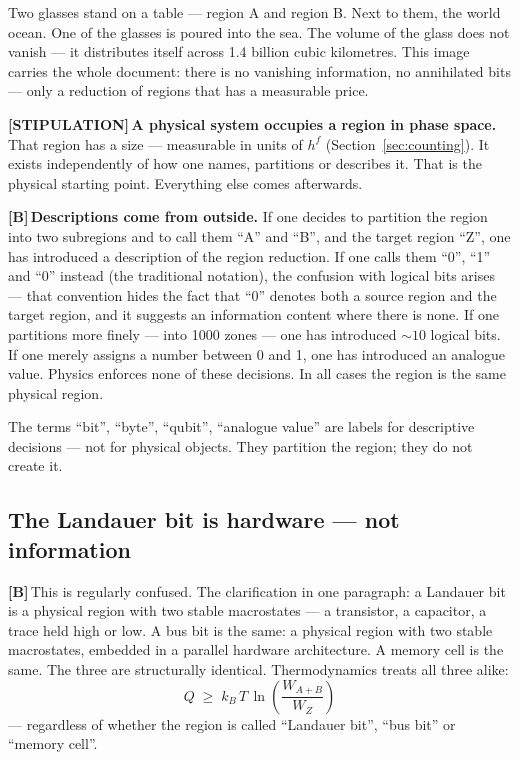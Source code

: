 \documentclass[11pt,a4paper]{article}
\newcommand{\LS}{\textcolor{laySet}{\textbf{\footnotesize\textsf{[STIPULATION]}}}\,}
\newcommand{\LB}{\textcolor{layB}{\textbf{\footnotesize\textsf{[B]}}}\,}
\begin{document}
Two glasses stand on a table --- region A and region B. Next to them, the world
ocean. One of the glasses is poured into the sea. The volume of the glass does not
vanish --- it distributes itself across 1.4 billion cubic kilometres. This image
carries the whole document: there is no vanishing information, no annihilated
bits --- only a reduction of regions that has a measurable price.

\LS \textbf{A physical system occupies a region in phase space.} That region has a
size --- measurable in units of $h^f$ (Section~\ref{sec:counting}). It exists
independently of how one names, partitions or describes it. That is the physical
starting point. Everything else comes afterwards.

\LB \textbf{Descriptions come from outside.} If one decides to partition the
region into two subregions and to call them “A” and “B”, and the target region
“Z”, one has introduced a description of the region reduction. If one calls them
“0”, “1” and “0” instead (the traditional notation), the confusion with logical
bits arises --- that convention hides the fact that “0” denotes both a source
region and the target region, and it suggests an information content where there
is none. If one partitions more finely --- into 1000 zones --- one has introduced
${\sim}10$ logical bits. If one merely assigns a number between 0 and 1, one has
introduced an analogue value. Physics enforces none of these decisions. In all
cases the region is the same physical region.

The terms “bit”, “byte”, “qubit”, “analogue value” are labels for descriptive
decisions --- not for physical objects. They partition the region; they do not
create it.

\subsection{The Landauer bit is hardware --- not information}

\LB This is regularly confused. The clarification in one paragraph: a Landauer bit
is a physical region with two stable macrostates --- a transistor, a capacitor, a
trace held high or low. A bus bit is the same: a physical region with two stable
macrostates, embedded in a parallel hardware architecture. A memory cell is the
same. The three are structurally identical. Thermodynamics treats all three
alike:
\[
  Q \;\ge\; k_B\,T\,\ln\!\left(\frac{W_{A+B}}{W_Z}\right)
\]
--- regardless of whether the region is called “Landauer bit”, “bus bit” or
“memory cell”.
\end{document}
